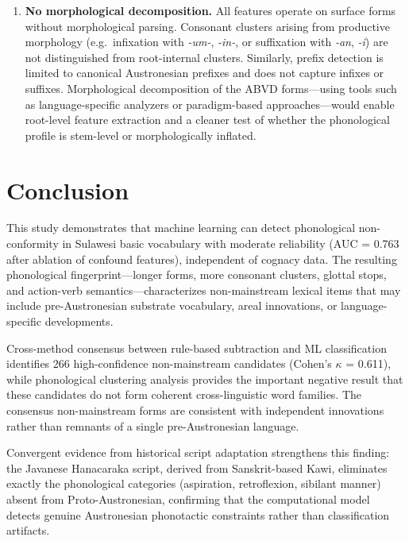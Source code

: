 \documentclass[12pt]{article}
\begin{document}
\begin{enumerate}
    \item \textbf{No morphological decomposition.} All features operate on surface forms without morphological parsing. Consonant clusters arising from productive morphology (e.g.\ infixation with \textit{-um-}, \textit{-in-}, or suffixation with \textit{-an}, \textit{-i}) are not distinguished from root-internal clusters. Similarly, prefix detection is limited to canonical Austronesian prefixes and does not capture infixes or suffixes. Morphological decomposition of the ABVD forms---using tools such as language-specific analyzers or paradigm-based approaches---would enable root-level feature extraction and a cleaner test of whether the phonological profile is stem-level or morphologically inflated.
\end{enumerate}

\section{Conclusion}

This study demonstrates that machine learning can detect phonological non-conformity in Sulawesi basic vocabulary with moderate reliability (AUC = 0.763 after ablation of confound features), independent of cognacy data.
The resulting phonological fingerprint---longer forms, more consonant clusters, glottal stops, and action-verb semantics---characterizes non-mainstream lexical items that may include pre-Austronesian substrate vocabulary, areal innovations, or language-specific developments.

Cross-method consensus between rule-based subtraction and ML classification identifies 266 high-confidence non-mainstream candidates (Cohen's $\kappa$ = 0.611), while phonological clustering analysis provides the important negative result that these candidates do not form coherent cross-linguistic word families.
The consensus non-mainstream forms are consistent with independent innovations rather than remnants of a single pre-Austronesian language.

Convergent evidence from historical script adaptation strengthens this finding: the Javanese Hanacaraka script, derived from Sanskrit-based Kawi, eliminates exactly the phonological categories (aspiration, retroflexion, sibilant manner) absent from Proto-Austronesian, confirming that the computational model detects genuine Austronesian phonotactic constraints rather than classification artifacts.
\end{document}
